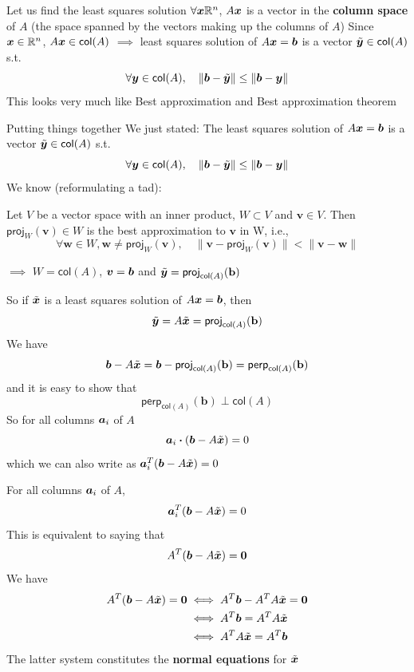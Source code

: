 \documentclass[aspectratio=169]{beamer}\usepackage[]{graphicx}\usepackage[]{xcolor}
\begin{document}
\begin{frame}{Let us find the least squares solution}
$\forall \bm{x}\mathbb{R}^n$, $A\bm{x}$ is a vector in the \textbf{column space} of $A$ (the space spanned by the vectors making up the columns of $A$)
\vfill
Since $\bm{x}\in\mathbb{R}^n$, $A\bm{x}\in\mathsf{col}(A)$
\vfill
$\implies$ least squares solution of $A\bm{x}=\bm{b}$ is a vector $\tilde{\bm{y}}\in\mathsf{col}(A)$ s.t.
\[
\forall\bm{y}\in\mathsf{col}(A),\quad\|\bm{b}-\tilde{\bm{y}}\|\leq\|\bm{b}-\bm{y}\|
\]
\vfill
This looks very much like Best approximation and Best approximation theorem
\end{frame}

\begin{frame}{Putting things together}
We just stated: The least squares solution of $A\bm{x}=\bm{b}$ is a vector $\tilde{\bm{y}}\in\mathsf{col}(A)$ s.t.
\[
\forall\bm{y}\in\mathsf{col}(A),\quad\|\bm{b}-\tilde{\bm{y}}\|\leq\|\bm{b}-\bm{y}\|
\]
\vfill
We know (reformulating a tad):
\begin{theorem}
Let $V$ be a vector space with an inner product, $W\subset V$ and $\mathbf{v}\in V$. Then $\mathsf{proj}_W(\mathbf{v})\in W$ is the best approximation to $\mathbf{v}$ in W, i.e.,
\[
\forall\mathbf{w}\in W, \mathbf{w}\neq\mathsf{proj}_W(\mathbf{v}), \quad
\|\mathbf{v}-\mathsf{proj}_W(\mathbf{v})\| < \|\mathbf{v}-\mathbf{w}\|
\]
\end{theorem}
\vfill
$\implies$ $W=\mathsf{col}(A)$, $\bm{v}=\bm{b}$ and $\tilde{\bm{y}}=\mathsf{proj}_{\mathsf{col}(A)}(\mathbf{b})$
\end{frame}

\begin{frame}
So if $\tilde{\bm{x}}$ is a least squares solution of $A\bm{x}=\bm{b}$, then
\[
\tilde{\bm{y}} = A\tilde{\bm{x}} = \mathsf{proj}_{\mathsf{col}(A)}(\mathbf{b})
\]
\vfill
We have
\[
\bm{b}-A\tilde{\bm{x}} = \bm{b}-\mathsf{proj}_{\mathsf{col}(A)}(\mathbf{b}) 
= \mathsf{perp}_{\mathsf{col}(A)}(\mathbf{b})
\]
and it is easy to show that
\[
\mathsf{perp}_{\mathsf{col}(A)}(\mathbf{b}) \perp \mathsf{col}(A)
\]
\vfill
So for all columns $\bm{a}_i$ of $A$
\[
\bm{a}_i\boldsymbol{\cdot}(\bm{b}-A\tilde{\bm{x}}) = 0
\]
which we can also write as $\bm{a}_i^T(\bm{b}-A\tilde{\bm{x}}) = 0$
\end{frame}

\begin{frame}
For all columns $\bm{a}_i$ of $A$,
\[\bm{a}_i^T(\bm{b}-A\tilde{\bm{x}}) = 0
\]
\vfill
This is equivalent to saying that
\[
A^T(\bb-A\tilde\bx) = \b0
\]
\vfill
We have
\begin{align*}
A^T(\bb-A\tilde\bx) = \b0 &\iff A^T\bb - A^TA\tilde\bx = \b0 \\
&\iff A^T\bb = A^TA\tilde\bx \\
&\iff A^TA\tilde\bx = A^T\bb
\end{align*}
The latter system constitutes the \textbf{normal equations} for $\tilde{\bm{x}}$
\end{frame}
\end{document}
